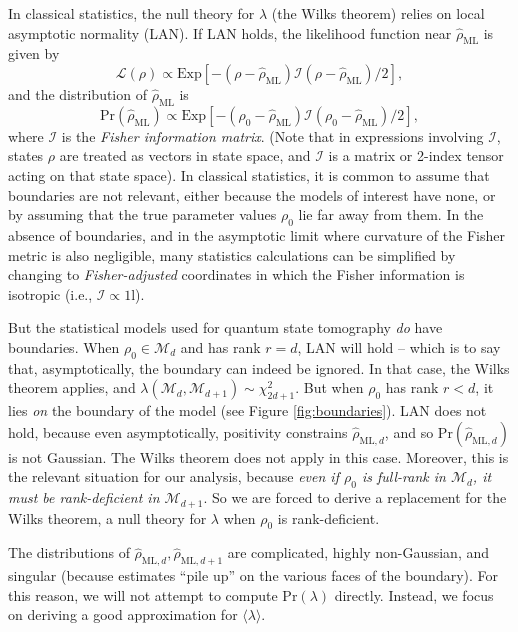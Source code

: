 \documentclass[aps,pra, twocolumn]{revtex4-1}
\newcommand{\M}{\mathcal{M}}
\newcommand{\Id}{\mathbb{I}}
\def\Id{1\!\mathrm{l}}
\newcommand{\rhohat}{\hat{\rho}}
\newcommand{\rhoML}[1]{\rhohat_{\scriptscriptstyle{\mathrm{ML},#1}}}
\begin{document}
In classical statistics, the null theory for $\lambda$ (the Wilks theorem) relies on local asymptotic normality (LAN).  If LAN holds, the likelihood function near $\rhohat_{\mathrm{ML}}$ is given by
\begin{equation}
\mathcal{L}(\rho) \propto \text{Exp}\left[-(\rho - \rhohat_{\mathrm{ML}})\mathcal{I}(\rho - \rhohat_{\mathrm{ML}})/2\right],
\end{equation}
and the distribution of $\rhohat_{\mathrm{ML}}$ is
\begin{equation}
\mathrm{Pr}(\rhohat_{\mathrm{ML}}) \propto \text{Exp}\left[-(\rho_{0} - \rhohat_{\mathrm{ML}})\mathcal{I}(\rho_{0} - \rhohat_{\mathrm{ML}})/2\right],
\end{equation}
where $\mathcal{I}$ is the \emph{Fisher information matrix}.  (Note that in expressions involving $\mathcal{I}$, states $\rho$ are treated as vectors in state space, and $\mathcal{I}$ is a matrix or 2-index tensor acting on that state space).  In classical statistics, it is common to assume that boundaries are not relevant, either because the models of interest have none, or by assuming that the true parameter values $\rho_{0}$ lie far away from them.  In the absence of boundaries, and in the asymptotic limit where curvature of the Fisher metric is also negligible, many statistics calculations can be simplified by changing to \emph{Fisher-adjusted} coordinates in which the Fisher information is isotropic (i.e., $\mathcal{I}\propto\Id$).

But the statistical models used for quantum state tomography \emph{do} have boundaries.  When $\rho_{0}\in \M_{d}$ and has rank $r = d$, LAN will hold -- which is to say that, asymptotically, the boundary can indeed be ignored.  In that case, the Wilks theorem applies, and $\lambda(\M_{d}, \M_{d + 1}) \sim \chi^{2}_{2d + 1}$.  But when $\rho_{0}$ has rank $r<d$, it lies \emph{on} the boundary of the model (see Figure \ref{fig:boundaries}).  LAN does not hold, because even asymptotically, positivity constrains $\rhoML{d}$, and so $\mathrm{Pr}(\rhoML{d})$ is not Gaussian.  The Wilks theorem does not apply in this case.  Moreover, this is the relevant situation for our analysis, because \emph{even if $\rho_{0}$ is full-rank in $\M_{d}$, it must be rank-deficient in $\M_{d+1}$}.  So we are forced to derive a replacement for the Wilks theorem, a null theory for $\lambda$ when $\rho_0$ is rank-deficient.

The distributions of $\rhoML{d}, \rhoML{d+1}$ are complicated, highly non-Gaussian, and singular (because estimates ``pile up'' on the various faces of the boundary).  For this reason, we will not attempt to compute $\mathrm{Pr}(\lambda)$ directly.  Instead, we focus on deriving a good approximation for $\langle \lambda \rangle$.
\end{document}
